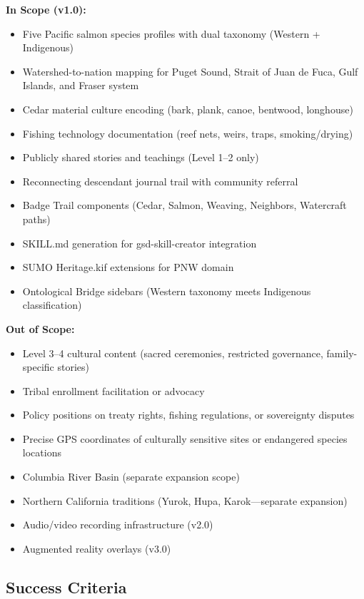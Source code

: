 \documentclass[11pt,letterpaper]{article}
\begin{document}
\textbf{In Scope (v1.0):}
\begin{itemize}[leftmargin=2em]
\item Five Pacific salmon species profiles with dual taxonomy (Western + Indigenous)
\item Watershed-to-nation mapping for Puget Sound, Strait of Juan de Fuca, Gulf Islands, and Fraser system
\item Cedar material culture encoding (bark, plank, canoe, bentwood, longhouse)
\item Fishing technology documentation (reef nets, weirs, traps, smoking/drying)
\item Publicly shared stories and teachings (Level 1--2 only)
\item Reconnecting descendant journal trail with community referral
\item Badge Trail components (Cedar, Salmon, Weaving, Neighbors, Watercraft paths)
\item SKILL.md generation for gsd-skill-creator integration
\item SUMO Heritage.kif extensions for PNW domain
\item Ontological Bridge sidebars (Western taxonomy meets Indigenous classification)
\end{itemize}

\textbf{Out of Scope:}
\begin{itemize}[leftmargin=2em]
\item Level 3--4 cultural content (sacred ceremonies, restricted governance, family-specific stories)
\item Tribal enrollment facilitation or advocacy
\item Policy positions on treaty rights, fishing regulations, or sovereignty disputes
\item Precise GPS coordinates of culturally sensitive sites or endangered species locations
\item Columbia River Basin (separate expansion scope)
\item Northern California traditions (Yurok, Hupa, Karok---separate expansion)
\item Audio/video recording infrastructure (v2.0)
\item Augmented reality overlays (v3.0)
\end{itemize}

\subsection{Success Criteria}
\end{document}
